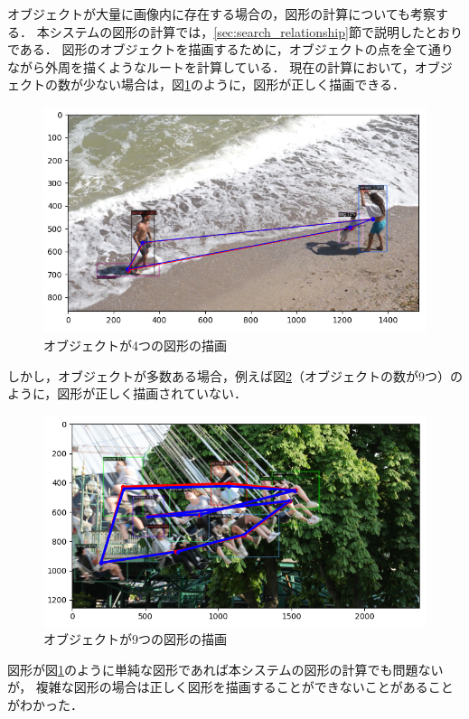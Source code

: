 \documentclass[a4j,12pt,dvipdfmx]{jreport}
\begin{document}
オブジェクトが大量に画像内に存在する場合の，図形の計算についても考察する．
本システムの図形の計算では，\ref{sec:search_relationship}節で説明したとおりである．
図形のオブジェクトを描画するために，オブジェクトの点を全て通りながら外周を描くようなルートを計算している．
現在の計算において，オブジェクトの数が少ない場合は，図\ref{fig:img_2_4_4}のように，図形が正しく描画できる．
\begin{figure}[t]
  \centering
  \includegraphics[width=13cm]{image/result_2_4_4.png}
  \caption{オブジェクトが4つの図形の描画}
  \label{fig:img_2_4_4}
\end{figure}

しかし，オブジェクトが多数ある場合，例えば図\ref{fig:img_2_4_5}（オブジェクトの数が9つ）のように，図形が正しく描画されていない．
\begin{figure}[t]
  \centering
  \includegraphics[width=13cm]{image/result_2_4_5.png}
  \caption{オブジェクトが9つの図形の描画}
  \label{fig:img_2_4_5}
\end{figure}

図形が図\ref{fig:img_2_4_4}のように単純な図形であれば本システムの図形の計算でも問題ないが，
複雑な図形の場合は正しく図形を描画することができないことがあることがわかった．
\end{document}
